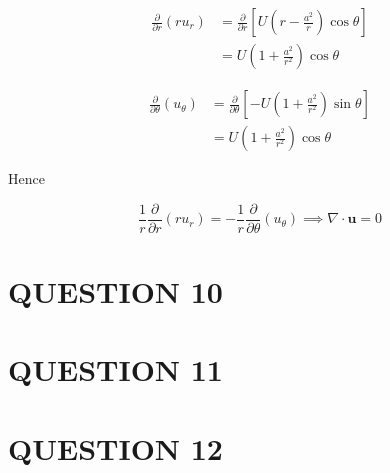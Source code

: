 \documentclass[a4paper]{article}
\begin{document}
\begin{align*}
\frac{\partial }{\partial r}(ru_{r}) & = \frac{\partial }{\partial r} \left[  U \left(  r - \frac{a^{2}}{r} \right) \cos \theta \right]    \\
& = U \left(  1 + \frac{a^{2}}{r^{2}} \right) \cos \theta 
\end{align*}

\begin{align*}
\frac{\partial }{\partial \theta}(u_{\theta}) & = \frac{\partial }{\partial \theta} \left[ -U \left( 1 + \frac{a^{2}}{r^{2}} \right)  \sin \theta \right]    \\
& = U \left( 1 + \frac{a^{2}}{r^{2}} \right)  \cos \theta
\end{align*}

Hence 

\[  \frac{1}{r} \frac{\partial }{\partial r}(ru_{r}) = - \frac{1}{r} \frac{\partial }{\partial \theta}(u_{\theta}) \implies \nabla \cdot \mathbf{u} = 0  \]



\section{QUESTION 10}
\section{QUESTION 11}
\section{QUESTION 12}
\end{document}
